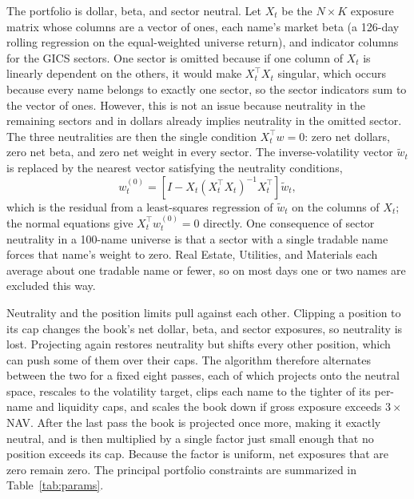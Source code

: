 \documentclass[11pt]{article}
\begin{document}
The portfolio is dollar, beta, and sector neutral. Let $X_t$ be the $N\times K$ exposure matrix whose columns are a vector of ones, each name's market beta (a 126-day rolling regression on the equal-weighted universe return), and indicator columns for the GICS sectors. One sector is omitted because if one column of $X_t$ is linearly dependent on the others, it would make $X_t^\top X_t$ singular, which occurs because every name belongs to exactly one sector, so the sector indicators sum to the vector of ones. However, this is not an issue because neutrality in the remaining sectors and in dollars already implies neutrality in the omitted sector. The three neutralities are then the single condition $X_t^\top w=0$: zero net dollars, zero net beta, and zero net weight in every sector. The inverse-volatility vector $\tilde w_t$ is replaced by the nearest vector satisfying the neutrality conditions,
\begin{equation}
 w_t^{(0)}=\left[I-X_t(X_t^\top X_t)^{-1}X_t^\top\right]\tilde w_t,
\end{equation}
which is the residual from a least-squares regression of $\tilde w_t$ on the columns of $X_t$; the normal equations give $X_t^\top w_t^{(0)}=0$ directly. One consequence of sector neutrality in a 100-name universe is that a sector with a single tradable name forces that name's weight to zero. Real Estate, Utilities, and Materials each average about one tradable name or fewer, so on most days one or two names are excluded this way.

Neutrality and the position limits pull against each other. Clipping a position to its cap changes the book's net dollar, beta, and sector exposures, so neutrality is lost. Projecting again restores neutrality but shifts every other position, which can push some of them over their caps. The algorithm therefore alternates between the two for a fixed eight passes, each of which projects onto the neutral space, rescales to the volatility target, clips each name to the tighter of its per-name and liquidity caps, and scales the book down if gross exposure exceeds $3\times$NAV. After the last pass the book is projected once more, making it exactly neutral, and is then multiplied by a single factor just small enough that no position exceeds its cap. Because the factor is uniform, net exposures that are zero remain zero.
The principal portfolio constraints are summarized in Table~\ref{tab:params}.
\end{document}
